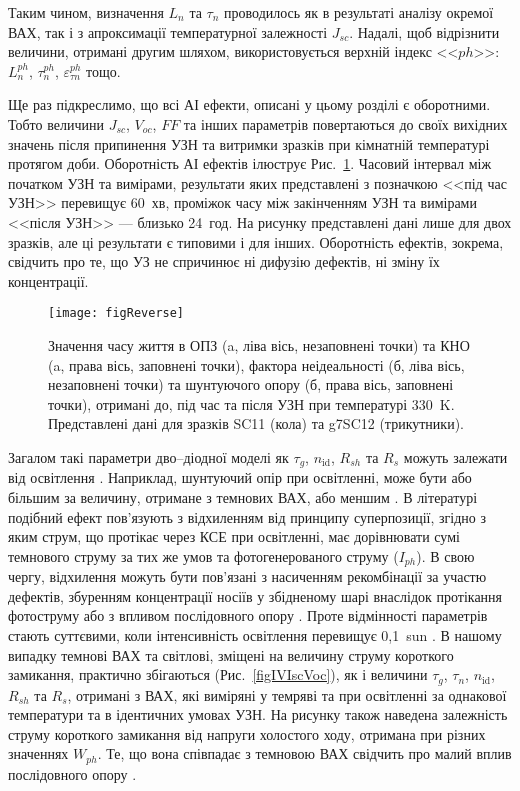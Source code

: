Таким чином, визначення $L_n$ та $\tau_n$ проводилось як в результаті аналізу окремої ВАХ, так і з апроксимації
температурної залежності $J_{sc}$.
Надалі, щоб відрізнити величини, отримані другим шляхом, використовується верхній індекс <<$ph$>>: $L_n^{ph}$, $\tau_n^{ph}$, $\varepsilon_{\tau n}^{ph}$ тощо.

Ще раз підкреслимо, що всі АІ ефекти, описані у цьому розділі є оборотними.
Тобто величини $J_{sc}$, $V_{oc}$, $F\!F$ та інших параметрів повертаються до своїх вихідних значень
після припинення УЗН  та витримки зразків при кімнатній температурі протягом доби.
Оборотність АІ ефектів ілюструє Рис.~\ref{figReverse}.
Часовий інтервал між початком УЗН та вимірами, результати яких представлені з позначкою <<під час УЗН>>
перевищує 60~хв, проміжок часу між закінченням УЗН та вимірами <<після УЗН>> --- близько 24~год.
На рисунку представлені дані лише для двох зразків, але ці результати є типовими і для інших.
Оборотність ефектів, зокрема, свідчить про те, що УЗ не спричинює ні дифузію дефектів,
ні зміну їх концентрації.

\begin{figure}
\center
\texttt{[image: figReverse]}%
\caption{\label{figReverse}
Значення часу життя в ОПЗ (a, ліва вісь, незаповнені точки)
та КНО (a, права вісь, заповнені точки),
фактора неідеальності (б, ліва вісь, незаповнені точки) та
шунтуючого опору (б, права вісь, заповнені точки),
отримані до, під час та після УЗН при температурі 330~K.
Представлені дані для зразків SC11 (кола) та g7SC12 (трикутники).
}%
\end{figure}

Загалом такі параметри дво--діодної моделі як $\tau_g$, $n_{\mathrm{id}}$, $R_{sh}$ та $R_s$ можуть залежати від освітлення \cite{Iph:KHAN2010,Breitenstein2013,SUGIANTO2009}.
Наприклад, шунтуючий опір при освітленні, може бути або більшим за величину, отримане з темнових ВАХ\cite{Iph:KHAN2010}, або меншим \cite{Breitenstein2013,SUGIANTO2009}.
В літературі \cite{Breitenstein2013} подібний ефект пов'язують з відхиленням від принципу суперпозиції,
згідно з яким струм, що протікає через КСЕ при освітленні, має дорівнювати сумі темнового струму за тих же умов та фотогенерованого струму ($I_{ph}$).
В свою чергу, відхилення можуть бути пов'язані з насиченням рекомбінації за участю дефектів,
збуренням концентрації носіїв у збідненому шарі внаслідок протікання фотоструму \cite{Robinson} або з впливом послідовного опору \cite{Rs:BREITENSTEIN2013}.
Проте відмінності параметрів стають суттєвими, коли інтенсивність освітлення перевищує 0,1~sun \cite{Breitenstein2013}.
В нашому випадку темнові ВАХ та світлові, зміщені на величину струму короткого замикання, практично збігаються (Рис.~\ref{figIVIscVoc}),
як і величини $\tau_g$, $\tau_n$, $n_{\mathrm{id}}$, $R_{sh}$ та $R_s$, отримані з ВАХ, які виміряні у темряві та при освітленні за однакової температури
та в ідентичних умовах УЗН.
На рисунку також наведена залежність струму короткого замикання від напруги холостого ходу, отримана при різних значеннях $W_{ph}$.
Те, що вона співпадає з темновою ВАХ свідчить про малий вплив послідовного опору \cite{Robinson}.

